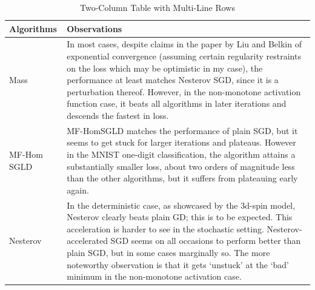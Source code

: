 \documentclass{article}
\begin{document}
\begin{table}[H]
\centering
\begin{tabular}{|p{7cm}|p{7cm}|} %
\hline
\textbf{Algorithms} & \textbf{Observations} \\
\hline\hline
Mass & In most cases, despite claims in the paper by Liu and Belkin \cite{liu2019acceleratingsgdmomentumoverparameterized} of exponential convergence (assuming certain regularity restraints on the loss which may be optimistic in my case), the performance at least matches Nesterov SGD, since it is a perturbation thereof. However, in the non-monotone activation function case, it beats all algorithms in later iterations and descends the fastest in loss.
\\
\hline
MF-Hom SGLD &MF-HomSGLD matches the performance of plain SGD, but it seems to get stuck for larger iterations and plateaus. However in the MNIST one-digit classification, the algorithm attains a substantially smaller loss, about two orders of magnitude less than the other algorithms, but it suffers from plateauing early again.
 \\
\hline
Nesterov & 	In the deterministic case, as showcased by the 3d-spin model, Nesterov clearly beats plain GD;  this is to be expected.
	This acceleration is harder to see in the stochastic setting. Nesterov-accelerated SGD seems on all occasions to perform better than plain SGD, but in some cases marginally so.
	The more noteworthy observation is that it gets ‘unstuck’ at the ‘bad’ minimum in the non-monotone activation case.
 \\
\hline
\end{tabular}
\caption{Two-Column Table with Multi-Line Rows}
\end{table}

\newpage




\end{document}
